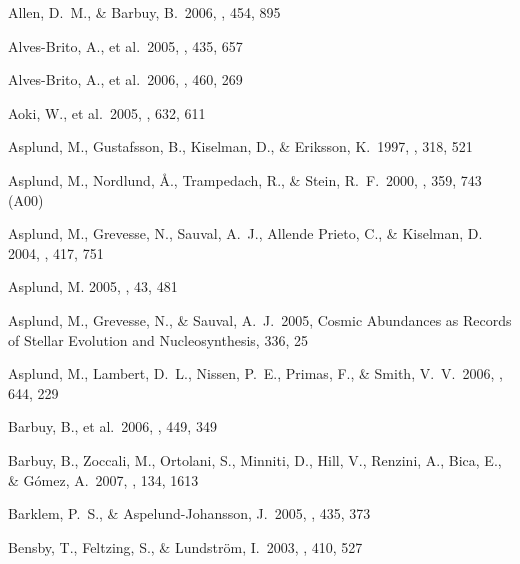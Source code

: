 \documentclass[traditabstract]{aa} %
\begin{document}
\begin{thebibliography}{}
 Allen, D.~M., \& Barbuy, B.\ 2006, \aap, 454, 895 

 Alves-Brito, A., et al.\ 2005, \aap, 435, 657 

 Alves-Brito, A., et al.\ 2006, \aap, 460, 269 

 Aoki, W., et al.\ 2005, 
\apj, 632, 611 

 Asplund, M., Gustafsson, B., Kiselman, D., \& Eriksson, K.\ 1997, \aap, 318, 521 

 Asplund, M., Nordlund, {\AA}., Trampedach, R., \& Stein, R.~F.\ 2000, \aap, 359, 743 (A00)

{Asplund}, M., {Grevesse}, N., {Sauval}, A.~J., {Allende Prieto}, C., \&
  {Kiselman}, D. 2004, \aap, 417, 751

{Asplund}, M. 2005, \araa, 43, 481

 Asplund, M., Grevesse, 
N., 
\& Sauval, A.~J.\ 2005, Cosmic Abundances as Records of Stellar Evolution and Nucleosynthesis, 336, 25 

 Asplund, M., Lambert, 
D.~L., Nissen, P.~E., Primas, F., \& Smith, V.~V.\ 2006, \apj, 644, 229 

 Barbuy, B., et al.\ 2006, \aap, 449, 349 

 Barbuy, B., Zoccali, M., 
Ortolani, S., Minniti, D., Hill, V., Renzini, A., Bica, E., 
\& G{\'o}mez, A.\ 2007, \aj, 134, 1613 

 Barklem, P.~S., \& Aspelund-Johansson, J.\ 2005, \aap, 435, 373 

 Bensby, T., Feltzing, S., \& Lundstr{\"o}m, I.\ 2003, \aap, 410, 527 


\end{thebibliography}
\end{document}
